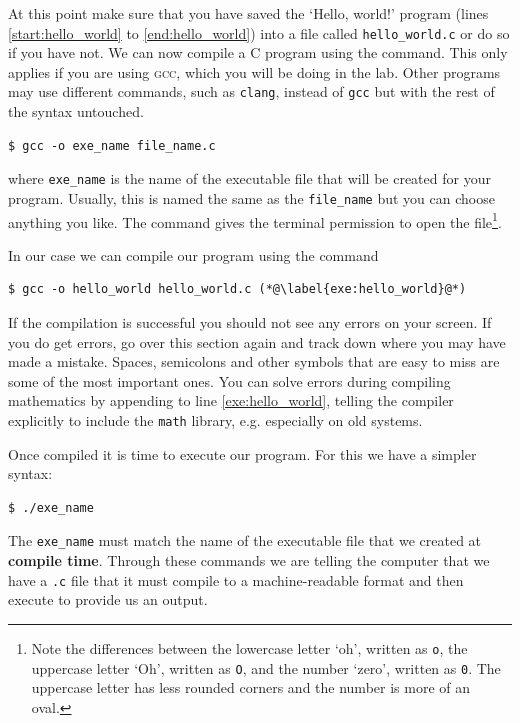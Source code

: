 \documentclass[11pt,oneside]{article}
\begin{document}
At this point make sure that you have saved the `Hello, world!' program (lines \ref{start:hello_world} to \ref{end:hello_world}) into a file called \verb+hello_world.c+ or do so if you have not. We can now compile a C program using the  command. This only applies if you are using \textsc{gcc}, which you will be doing in the lab. Other programs may use different commands, such as \texttt{clang}, instead of \texttt{gcc} but with the rest of the syntax untouched.

\begin{lstlisting}
$ gcc -o exe_name file_name.c
\end{lstlisting}
where \verb+exe_name+ is the name of the executable file that will be created for your program. Usually, this is named the same as the \verb+file_name+ but you can choose anything you like. The command  gives the terminal permission to open the file\footnote{Note the differences between the lowercase letter `oh', written as  \texttt{o}, the uppercase letter `Oh', written as  \texttt{O}, and the number `zero', written as  \texttt{0}. The uppercase letter has less rounded corners and the number is more of an oval.}.

In our case we can compile our program using the command

\begin{lstlisting}
$ gcc -o hello_world hello_world.c (*@\label{exe:hello_world}@*)
\end{lstlisting}
If the compilation is successful you should not see any errors on your screen. If you do get errors, go over this section again and track down where you may have made a mistake. Spaces, semicolons and other symbols that are easy to miss are some of the most important ones. You can solve errors during compiling mathematics by appending  to line \ref{exe:hello_world}, telling the compiler explicitly to include the \verb+math+ library, e.g.  especially on old systems.

Once compiled it is time to execute our program. For this we have a simpler syntax:

\begin{lstlisting}
$ ./exe_name
\end{lstlisting}
The \verb+exe_name+ must match the name of the executable file that we created at \textbf{compile time}. Through these commands we are telling the computer that we have a \verb+.c+ file that it must compile to a machine-readable format and then execute to provide us an output.
\end{document}
